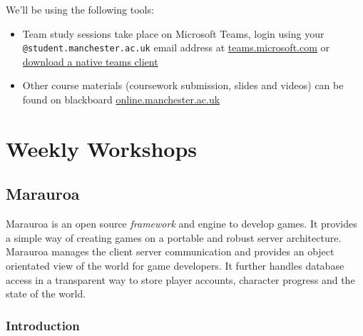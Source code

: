 \documentclass[
]{book}
\providecommand{\tightlist}{%
  \setlength{\itemsep}{0pt}\setlength{\parskip}{0pt}}
\begin{document}
We'll be using the following tools:

\begin{itemize}
\tightlist
\item
  Team study sessions take place on Microsoft Teams, login using your \texttt{@student.manchester.ac.uk} email address at \href{https://teams.microsoft.com/}{teams.microsoft.com} or \href{https://www.microsoft.com/en-gb/microsoft-teams/download-app}{download a native teams client}
\item
  Other course materials (coursework submission, slides and videos) can be found on blackboard \href{https://online.manchester.ac.uk/}{online.manchester.ac.uk}
\end{itemize}



























\hypertarget{part-weekly-workshops}{%
\part{Weekly Workshops}\label{part-weekly-workshops}}

\hypertarget{building}{%
\chapter{Marauroa}\label{building}}

Marauroa is an open source \emph{framework} and engine to develop games. It provides a simple way of creating games on a portable and robust server architecture. Marauroa manages the client server communication and provides an object orientated view of the world for game developers. It further handles database access in a transparent way to store player accounts, character progress and the state of the world.

\hypertarget{Introduction}{%
\section{Introduction}\label{Introduction}}
\end{document}
